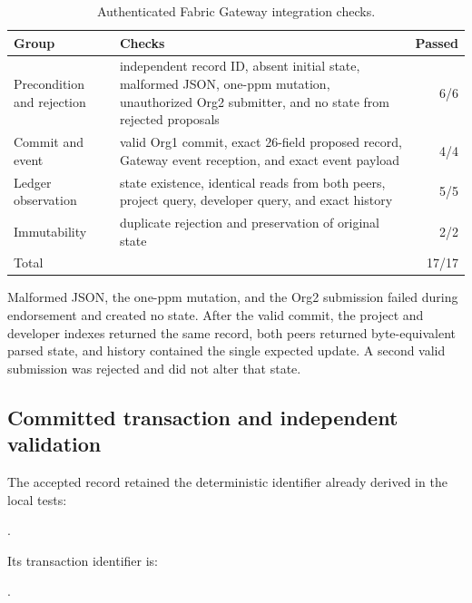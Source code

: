 \begin{table}[H]
\centering
\small
\renewcommand{\arraystretch}{1.08}
\begin{tabularx}{\textwidth}{p{3.6cm}Xr}
\toprule
\textbf{Group} & \textbf{Checks} & \textbf{Passed} \\
\midrule
Precondition and rejection & independent record ID, absent initial state, malformed JSON, one-ppm mutation, unauthorized Org2 submitter, and no state from rejected proposals & 6/6 \\
Commit and event & valid Org1 commit, exact 26-field proposed record, Gateway event reception, and exact event payload & 4/4 \\
Ledger observation & state existence, identical reads from both peers, project query, developer query, and exact history & 5/5 \\
Immutability & duplicate rejection and preservation of original state & 2/2 \\
\midrule
Total & & 17/17 \\
\bottomrule
\end{tabularx}
\caption{Authenticated Fabric Gateway integration checks.}
\label{tab:phase3_fabric_gateway_checks}
\end{table}

Malformed JSON, the one-ppm mutation, and the Org2 submission failed during endorsement and created no state. After the
valid commit, the project and developer indexes returned the same record, both peers returned byte-equivalent parsed state,
and history contained the single expected update. A second valid submission was rejected and did not alter that state.

\subsection{Committed transaction and independent validation}
\label{sec:phase3_fabric_transaction}

The accepted record retained the deterministic identifier already derived in the local tests:

\begin{center}
\scriptsize
{}.
\end{center}

Its transaction identifier is:

\begin{center}
\scriptsize
{}.
\end{center}

